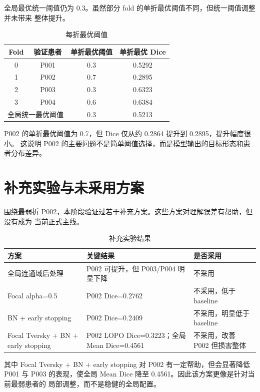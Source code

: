 \documentclass[UTF8,11pt]{ctexart}
\begin{document}
全局最优统一阈值仍为 0.3。虽然部分 fold 的单折最优阈值不同，但统一阈值调整并未带来
整体提升。

\begin{table}[htbp]
\centering
\caption{每折最优阈值}
\label{tab:threshold-fold}
\begin{tabular}{cccc}
\toprule
Fold & 验证患者 & 单折最优阈值 & 单折最优 Dice \\
\midrule
0 & P001 & 0.3 & 0.5292 \\
1 & P002 & 0.7 & 0.2895 \\
2 & P003 & 0.3 & 0.6323 \\
3 & P004 & 0.6 & 0.6384 \\
\midrule
\multicolumn{2}{r}{全局统一最优阈值} & 0.3 & 0.5213 \\
\bottomrule
\end{tabular}
\end{table}

P002 的单折最优阈值为 0.7，但 Dice 仅从约 0.2864 提升到 0.2895，提升幅度很小。
这说明 P002 的主要问题不是简单阈值选择，而是模型输出的目标形态和患者分布差异。

\section{补充实验与未采用方案}

围绕最弱折 P002，本阶段验证过若干补充方案。这些方案对理解误差有帮助，但没有成为
当前正式主线。

\begin{table}[htbp]
\centering
\caption{补充实验结果}
\label{tab:extra-experiments}
\begin{tabular}{p{}p{}p{}}
\toprule
方案 & 关键结果 & 是否采用 \\
\midrule
全局连通域后处理 & P002 可提升，但 P003/P004 明显下降 & 不采用 \\
Focal alpha=0.5 & P002 Dice=0.2762 & 不采用，低于 baseline \\
BN + early stopping & P002 Dice=0.2409 & 不采用，明显低于 baseline \\
Focal Tversky + BN + early stopping & P002 LOPO Dice=0.3223；全局 Mean Dice=0.4561 & 不采用，改善 P002 但损害整体 \\
\bottomrule
\end{tabular}
\end{table}

其中 Focal Tversky + BN + early stopping 对 P002 有一定帮助，但会显著降低 P001 与
P003 的表现，使全局 Mean Dice 降至 0.4561。因此该方案更像是针对当前最弱患者的
局部调整，而不是稳健的全局配置。
\end{document}
